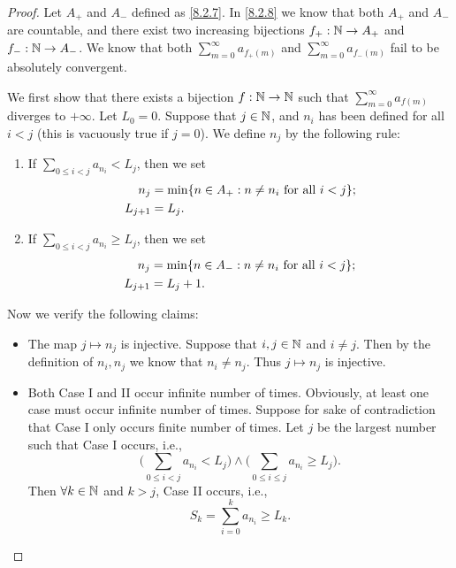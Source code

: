 \begin{proof}
	Let \(A_+\) and \(A_-\) defined as \cref{8.2.7}.
	In \cref{8.2.8} we know that both \(A_+\) and \(A_-\) are countable, and there exist two increasing bijections \(f_+ : \mathbb{N} \to A_+\) and \(f_- : \mathbb{N} \to A_-\).
	We know that both \(\sum_{m = 0}^\infty a_{f_+(m)}\) and \(\sum_{m = 0}^\infty a_{f_-(m)}\) fail to be absolutely convergent.

	We first show that there exists a bijection \(f : \mathbb{N} \to \mathbb{N}\) such that \(\sum_{m = 0}^\infty a_{f(m)}\) diverges to \(+\infty\).
	Let \(L_0 = 0\).
	Suppose that \(j \in \mathbb{N}\), and \(n_i\) has been defined for all \(i < j\)
	(this is vacuously true if \(j = 0\)).
	We define \(n_j\) by the following rule:
	\begin{enumerate}[label=(\Roman*)]
		\item If \(\sum_{0 \leq i < j} a_{n_i} < L_j\), then we set
		      \begin{align*}
			      n_j       & = \min\set{n \in A_+ : n \neq n_i \text{ for all } i < j}; \\
			      L_{j + 1} & = L_j.
		      \end{align*}
		\item If \(\sum_{0 \leq i < j} a_{n_i} \geq L_j\), then we set
		      \begin{align*}
			      n_j       & = \min\set{n \in A_- : n \neq n_i \text{ for all } i < j}; \\
			      L_{j + 1} & = L_j + 1.
		      \end{align*}
	\end{enumerate}
	Now we verify the following claims:
	\begin{itemize}
		\item The map \(j \mapsto n_j\) is injective.
		      Suppose that \(i, j \in \mathbb{N}\) and \(i \neq j\).
		      Then by the definition of \(n_i, n_j\) we know that \(n_i \neq n_j\).
		      Thus \(j \mapsto n_j\) is injective.
		\item Both Case I and II occur infinite number of times.
		      Obviously, at least one case must occur infinite number of times.
		      Suppose for sake of contradiction that Case I only occurs finite number of times.
		      Let \(j\) be the largest number such that Case I occurs, i.e.,
		      \[
			      \Bigg(\sum_{0 \leq i < j} a_{n_i} < L_j\Bigg) \land \Bigg(\sum_{0 \leq i \leq j} a_{n_i} \geq L_j\Bigg).
		      \]
		      Then \(\forall k \in \mathbb{N}\) and \(k > j\), Case II occurs, i.e.,
		      \[
			      S_k = \sum_{i = 0}^k a_{n_i} \geq L_k.
		      \]

\end{itemize}
\end{proof}
